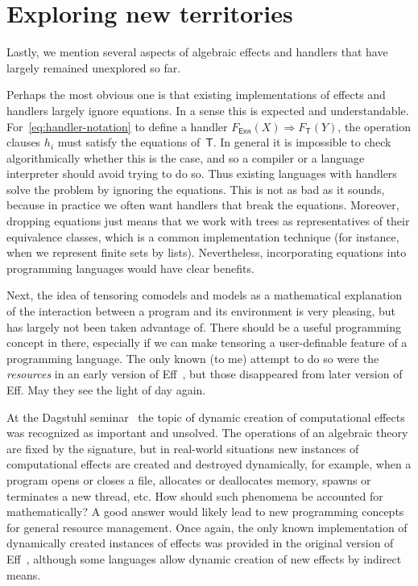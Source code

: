 \documentclass{amsart}
\newcommand{\theory}[1]{\mathsf{#1}} %
\newcommand{\Free}[2]{F_{\theory{#1}}(#2)} %
\newcommand{\hto}{\Rightarrow} %
\begin{document}
\section{Exploring new territories}
\label{sec:expl-new-terr}

Lastly, we mention several aspects of algebraic effects and handlers that have
largely remained unexplored so far.

Perhaps the most obvious one is that existing implementations of effects and
handlers largely ignore equations. In a sense this is expected and
understandable. For~\eqref{eq:handler-notation} to define a handler
$\Free{Exn}{X} \hto \Free{T}{Y}$, the operation clauses $h_i$ must satisfy the
equations of~$\theory{T}$. In general it is impossible to check algorithmically
whether this is the case, and so a compiler or a language interpreter should
avoid trying to do so. Thus existing languages with handlers solve the problem
by ignoring the equations. This is not as bad as it sounds, because in practice
we often want handlers that break the equations. Moreover, dropping equations
just means that we work with trees as representatives of their equivalence
classes, which is a common implementation technique (for instance, when we
represent finite sets by lists). Nevertheless, incorporating equations into
programming languages would have clear benefits.

Next, the idea of tensoring comodels and models as a mathematical explanation of
the interaction between a program and its environment is very pleasing, but has
largely not been taken advantage of. There should be a useful programming
concept in there, especially if we can make tensoring a user-definable feature
of a programming language. The only known (to me) attempt to do so were the
\emph{resources} in an early version of Eff~\cite{bauer15:_progr}, but those
disappeared from later version of Eff. May they see the light of day again.

At the Dagstuhl seminar~\cite{chandrasekaran18:_algeb} the topic of dynamic
creation of computational effects was recognized as important and unsolved. The
operations of an algebraic theory are fixed by the signature, but in real-world
situations new instances of computational effects are created and destroyed
dynamically, for example, when a program opens or closes a file, allocates or
deallocates memory, spawns or terminates a new thread, etc. How should such
phenomena be accounted for mathematically? A good answer would likely lead to
new programming concepts for general resource management. Once again, the only
known implementation of dynamically created instances of effects was provided in
the original version of Eff~\cite{bauer15:_progr}, although some languages allow
dynamic creation of new effects by indirect means.




\end{document}
